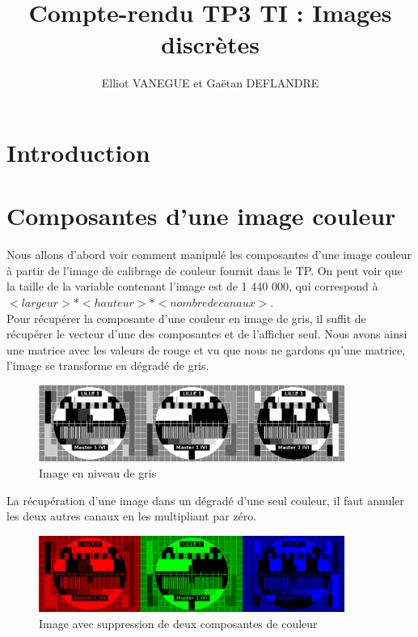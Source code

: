 \documentclass[a4paper,11pt]{article}
\title{Compte-rendu TP3 TI : Images discrètes}
\author{Elliot VANEGUE et Gaëtan DEFLANDRE}
\begin{document}


  \maketitle
  
  \mbox{}
  \newpage
  \clearpage
  
  \section*{Introduction}
  
  \section{Composantes d'une image couleur}
  Nous allons d'abord voir comment manipulé les composantes d'une image couleur à partir de l'image de calibrage
  de couleur fournit dans le TP. On peut voir que la taille de la variable contenant l'image est de 1 440 000,
  qui correspond à $<largeur> * <hauteur> * <nombre de canaux>$.\\
  
  Pour récupérer la composante d'une couleur en image de gris, il suffit de récupérer le vecteur d'une des composantes
  et de l'afficher seul. Nous avons ainsi une matrice avec les valeurs de rouge et vu que nous ne gardons qu'une matrice,
  l'image se transforme en dégradé de gris.\\
  
  \begin{figure}[H]
    \center
    \includegraphics[width=10cm]{../mire_gris.png}
    \caption{Image en niveau de gris}
  \end{figure}
  
  La récupération d'une image dans un dégradé d'une seul couleur, il faut annuler les deux autres canaux en les multipliant par
  zéro.
  
  \begin{figure}[H]
    \center
    \includegraphics[width=10cm]{../mire_couleur.png}
    \caption{Image avec suppression de deux composantes de couleur}
  \end{figure}
  
\end{document}
